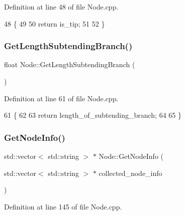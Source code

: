 Definition at line 48 of file Node.\+cpp.


\begin{DoxyCode}
48                    \{
49   
50   \textcolor{keywordflow}{return} is\_tip;
51   
52 \}
\end{DoxyCode}
\mbox{\label{classNode_a7e55b2011625f394b8b08310b8cf45dc}} 
\subsubsection{\texorpdfstring{Get\+Length\+Subtending\+Branch()}{GetLengthSubtendingBranch()}}
{\footnotesize\ttfamily float Node\+::\+Get\+Length\+Subtending\+Branch (\begin{DoxyParamCaption}{ }\end{DoxyParamCaption})}



Definition at line 61 of file Node.\+cpp.


\begin{DoxyCode}
61                                       \{
62   
63   \textcolor{keywordflow}{return} length\_of\_subtending\_branch;
64   
65 \}
\end{DoxyCode}
\mbox{\label{classNode_aeb57ef43b22fa37c2855ebb07e4e7331}} 
\subsubsection{\texorpdfstring{Get\+Node\+Info()}{GetNodeInfo()}}
{\footnotesize\ttfamily std\+::vector$<$ std\+::string $>$ $\ast$ Node\+::\+Get\+Node\+Info (\begin{DoxyParamCaption}\item[{std\+::vector$<$ std\+::string $>$ $\ast$}]{collected\+\_\+node\+\_\+info }\end{DoxyParamCaption})}



Definition at line 145 of file Node.\+cpp.


